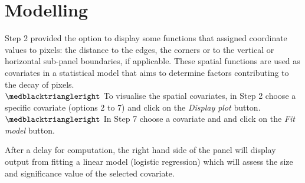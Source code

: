 \documentclass[11pt,a4paper]{article}
\begin{document}
\section{Modelling}\label{model}

Step 2 provided the option to display some functions that assigned coordinate values to pixels: the distance to the edges, the corners or to the vertical or horizontal sub-panel boundaries, if applicable. These spatial functions are used as covariates in a statistical model that aims to determine factors contributing to the decay of pixels. \\
$\medblacktriangleright$ To visualise the spatial covariates, in Step 2 choose a specific covariate
(options 2 to 7) and click on the \emph{Display plot} button.\\
$\medblacktriangleright$ In Step 7 choose a covariate and and click on the \emph{Fit model} button.

After a delay for computation,
the right hand side of the panel will display 
output from fitting a linear model (logistic regression) which will assess the size and significance value of the selected covariate. 








{}


\end{document}
